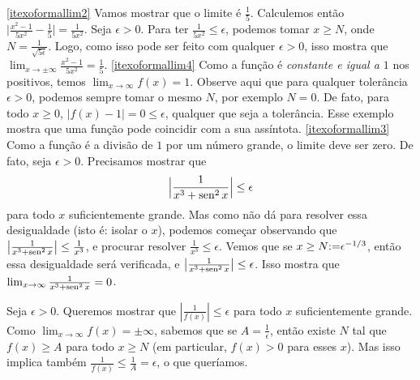 \begin{Solution}{4.4}
\eqref{itexoformallim2}
Vamos mostrar que o limite é $\tfrac15$.
Calculemos então
$\bigl|\frac{x^2-1}{5x^2}-\tfrac15\bigr|=\frac{1}{5x^2}$.
Seja $\epsilon>0$. Para ter $\tfrac{1}{5x^2}\leq \epsilon$, podemos tomar
$x\geq N$, onde $N=\frac{1}{\sqrt{5\epsilon}}$.
Logo, como isso pode ser feito com qualquer $\epsilon>0$, isso mostra que
$\lim_{x\to \pm\infty}\frac{x^2-1}{5x^2}=\tfrac15$.
\eqref{itexoformallim4}
Como a função é \emph{constante e igual a $1$} nos positivos, temos
$\lim_{x\to\infty}f(x)=1$. Observe aqui que para qualquer tolerância $\epsilon>0$,
podemos sempre tomar o mesmo $N$, por exemplo $N=0$. De fato, para todo $x\geq 0$,
$|f(x)-1|=0\leq \epsilon$, qualquer que seja a tolerância.
Esse exemplo mostra que uma função pode coincidir com a sua assíntota.
\eqref{itexoformallim3}
Como a função é a divisão de $1$ por um número grande, o limite deve ser zero.
De fato, seja $\epsilon>0$. Precisamos mostrar que
\[ \Bigl|\frac{1}{x^3+\operatorname{sen}^2 x}\Bigr|\leq \epsilon
\]
para todo $x$ suficientemente grande. Mas como não dá para resolver essa desigualdade
(isto é: isolar o $x$), podemos começar observando que
$\bigl|\frac{1}{x^3+\operatorname{sen}^2 x}\bigr|\leq	\frac{1}{x^3}$, e procurar
resolver $\frac{1}{x^3}\leq \epsilon$.
Vemos que se $x\geq N{:=} \epsilon^{-1/3}$, então essa desigualdade será
verificada, e $\bigl|\frac{1}{x^3+\operatorname{sen}^2 x}\bigr|\leq \epsilon$.
Isso mostra que $\lim_{x\to \infty}\frac{1}{x^3+\operatorname{sen}^2 x}=0$.
\end{Solution}
\begin{Solution}{4.5}
Seja $\epsilon>0$. Queremos mostrar que $|\frac{1}{f(x)}|\leq \epsilon$ para todo
$x$ suficientemente grande. Como $\lim_{x\to\infty}f(x)=\pm\infty$, sabemos que
se $A=\tfrac1\epsilon$, então existe $N$ tal que $f(x)\geq A$ para todo $x\geq
N$ (em particular, $f(x)>0$ para esses $x$). Mas isso implica também
$\frac{1}{f(x)}\leq \frac{1}{A}=\epsilon$, o que queríamos.
\end{Solution}
